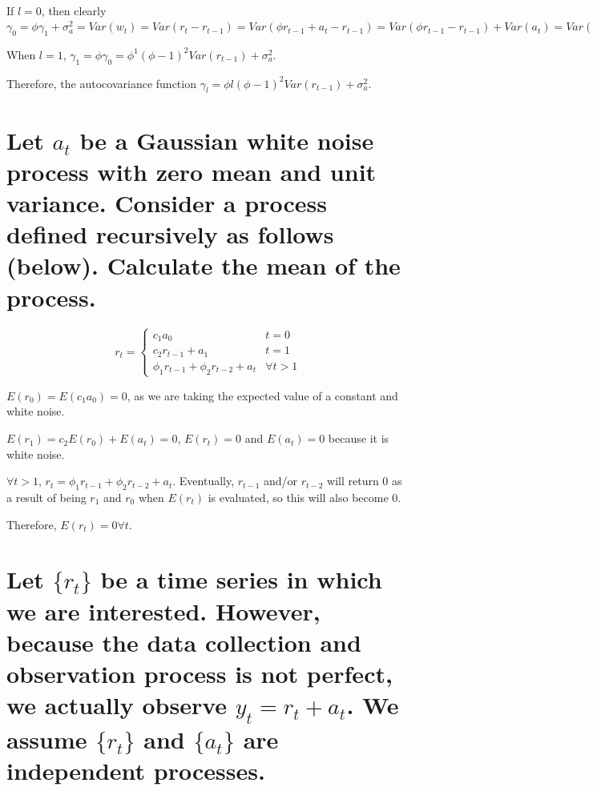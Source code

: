 \documentclass{article}
\begin{document}
\par\noindent\Large If $l = 0$, then clearly $\gamma_{0} = \phi\gamma_{1} + \sigma_{a}^{2} = Var(w_{t}) = Var(r_{t} - r_{t - 1}) = Var(\phi r_{t - 1} + a_{t} - r_{t - 1}) = Var(\phi r_{t - 1} - r_{t - 1}) + Var(a_{t}) = Var((\phi - 1)r_{t - 1}) + Var(a_{t}) = (\phi - 1)^{2}Var(r_{t - 1}) + \sigma_{a}^{2}$
\par\noindent\Large When $l = 1$, $\gamma_{1} = \phi\gamma_{0} = \phi^{1}(\phi - 1)^{2}Var(r_{t - 1}) + \sigma_{a}^{2}$.
\par\noindent\Large Therefore, the autocovariance function $\gamma_{l} = \phi{l}(\phi - 1)^{2}Var(r_{t - 1}) + \sigma_{a}^{2}$.

\section{Let ${a_{t}}$ be a Gaussian white noise process with zero mean and unit variance.  Consider a process defined recursively as follows (below).  Calculate the mean of the process.}

\[r_{t} = \begin{cases} 
      c_{1}a_{0} & t = 0 \\
      c_{2}r_{t - 1} + a_{1} & t = 1 \\
      \phi_{1}r_{t - 1} + \phi_{2}r_{t - 2} + a_{t} &\forall t > 1 
   \end{cases}
\]

\par\noindent\Large $E(r_{0}) = E(c_{1}a_{0}) = 0$, as we are taking the expected value of a constant and white noise.
\par\noindent\Large $E(r_{1}) = c_{2}E(r_{0}) + E(a_{t}) = 0$, $E(r_{t}) = 0$ and $E(a_{t}) = 0$ because it is white noise.
\par\noindent\Large $\forall t > 1$, $r_{t} = \phi_{1} r_{t - 1} + \phi_{2}r_{t - 2} + a_{t}$.  Eventually, $r_{t - 1}$ and/or $r_{t - 2}$ will return 0 as a result of being $r_{1}$ and $r_{0}$ when $E(r_{t})$ is evaluated, so this will also become 0.\vspace{0.25cm}

\par\noindent\Large Therefore, $E(r_{t}) = 0 \forall t$.

\section{Let $\{r_{t}\}$ be a time series in which we are interested.  However, because the data collection and observation process is not perfect, we actually observe $y_{t} = r_{t} + a_{t}$.  We assume $\{r_{t}\}$ and $\{a_{t}\}$ are independent processes.}
\end{document}
